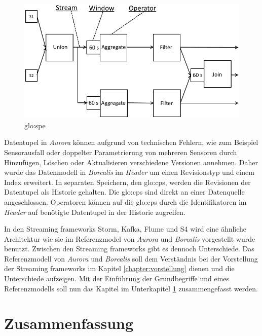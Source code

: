 \begin{figure}[htb!]
\centering
\includegraphics[width=1.0\textwidth]{bilder/QueryDiagram.png}
\caption{\acrlong{glo:spe}\label{fig:querydiagramspe}}
\end{figure}

Datentupel in \textit{Aurora} können aufgrund von technischen Fehlern, wie zum Beispiel Sensorausfall oder doppelter Parametrierung von mehreren Sensoren durch Hinzufügen, Löschen oder Aktualisieren verschiedene Versionen annehmen. Daher wurde das Datenmodell in \textit{Borealis} im \textit{Header} um einen Revisionstyp und einem Index erweitert. In separaten Speichern, den \glspl{glo:cp}, werden die Revisionen der Datentupel als Historie gehalten. Die \glspl{glo:cp} sind direkt an einer Datenquelle angeschlossen. Operatoren können auf die \glspl{glo:cp} durch die Identifikatoren im \textit{Header} auf benötigte Datentupel in der Historie zugreifen. 

In den Streaming frameworks Storm, Kafka, Flume und S4 wird eine ähnliche Architektur wie sie im Referenzmodel von \textit{Aurora} und \textit{Borealis} vorgestellt wurde benutzt. Zwischen den Streaming frameworks gibt es dennoch Unterschiede. Das Referenzmodell von \textit{Aurora} und \textit{Borealis} soll dem Verständnis bei der Vorstellung der Streaming frameworks im Kapitel \ref{chapter:vorstellung} dienen und die Unterschiede aufzeigen. Mit der Einführung der Grundbegriffe und eines Referenzmodells soll nun das Kapitel  im Unterkapitel \ref{section:zusammenfassung} zusammengefasst werden.

\section{Zusammenfassung}
\label{section:zusammenfassung}

